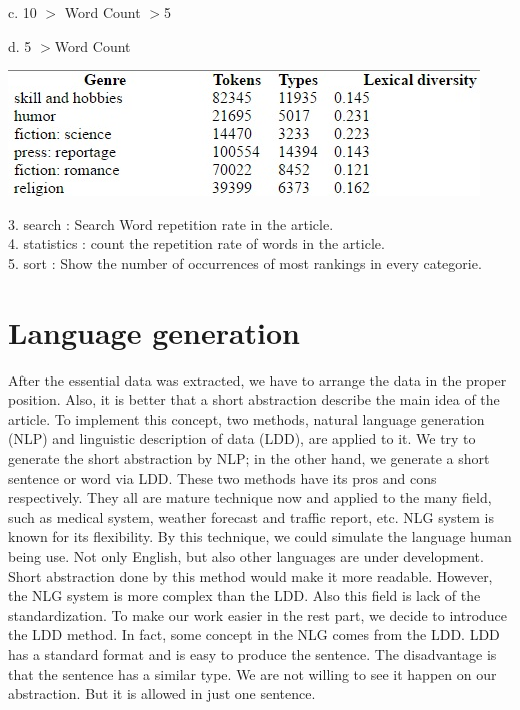 c. 10 $>$ Word Count $>$5 

d. 5 $>$Word Count

\begin{center}
	\includegraphics[width=\columnwidth]{union_02.jpg}
\end{center}
3. search       : Search Word repetition rate in the article.\\
4. statistics     : count the repetition rate of words in the article.\\
5. sort         : Show the  number of occurrences of most rankings in every categorie.\\




\section*{Language generation}
\label{sec:prob}
After the essential data was extracted, we have to arrange the data in the proper position. Also, it is better that a short abstraction describe the main idea of the article. To implement this concept, two methods, natural language generation (NLP) and linguistic description of data (LDD), are applied to it. We try to generate the short abstraction by NLP; in the other hand, we generate a short sentence or word via LDD.
These two methods have its pros and cons respectively. They all are mature technique now and applied to the many field, such as medical system, weather forecast and traffic report, etc. NLG system is known for its flexibility. By this technique, we could simulate the language human being use. Not only English, but also other languages are under development. Short abstraction done by this method would make it more readable. However, the NLG system is more complex than the LDD. Also this field is lack of the standardization. To make our work easier in the rest part, we decide to introduce the LDD method. In fact, some concept in the NLG comes from the LDD. LDD has a standard format and is easy to produce the sentence. The disadvantage is that the sentence has a similar type. We are not willing to see it happen on our abstraction. But it is allowed in just one sentence.

